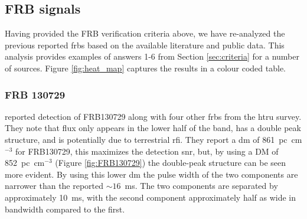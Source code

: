 \documentclass[a4paper,fleqn,usenatbib]{mnras}
\begin{document}
\subsection{FRB signals}

Having provided the FRB verification criteria above, we have re-analyzed the
previous reported \glspl{frb} based on the available literature and public data.
This analysis provides examples of answers 1-6 from Section \ref{sec:criteria}
for a number of sources. Figure \ref{fig:heat_map} captures the results in a
colour coded table. 













\subsubsection{FRB 130729}

\cite{2016MNRAS.460L..30C} reported detection of FRB130729 along with four other
\glspl{frb} from the \gls{htru} survey. They note that flux only appears in the
lower half of the band, has a double peak structure, and is potentially due to
terrestrial \gls{rfi}.  They report a \gls{dm} of 861~pc~cm$^{-3}$ for
FRB130729, this maximizes the detection \gls{snr}, but, by using a DM of
852~pc~cm$^{-3}$ (Figure \ref{fig:FRB130729}) the double-peak structure can be
seen more evident. By using this lower \gls{dm} the pulse width of the two
components are narrower than the reported $\sim 16$~ms.  The two components are
separated by approximately 10~ms, with the second component approximately half
as wide in bandwidth compared to the first.
\end{document}
